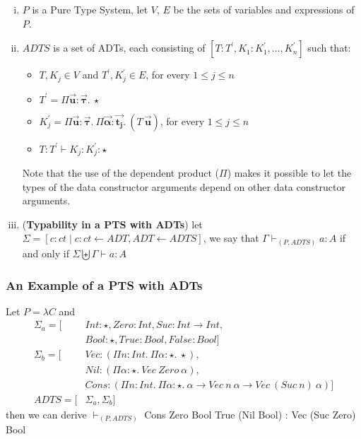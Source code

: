 \documentclass[oneside,a4paper]{article}
\numberwithin{equation}{section}
\begin{document}
\begin{enumerate}[(i)]
\item $P$ is a Pure Type System, let $V$, $E$ be the sets of variables
  and expressions of $P$.
\item $ADTS$ is a set of ADTs, each consisting of
  $[T : T^{\prime}, K_{1} : K_{1}^{\prime}, \dots, K_{n}^{\prime}]$
  such that:
  \begin{itemize}
  \item $T, K_{j} \in V$ and $T^{\prime}, K_{j}^{\prime} \in E$, for
    every $1 \leqslant j \leqslant n$
  \item
    $T^{\prime} = \Pi \vec{\mathbf{u}} : \vec{\mathbf{\tau}}.\ \star$
  \item
    $K_{j}^{\prime} = \Pi \vec{\mathbf{u}} : \vec{\mathbf{\tau}}.\ \Pi
    \vec{\mathbf{\alpha}}: \vec{\mathbf{t_{j}}}.\ (T\
    \vec{\mathbf{u}}) $, for every $1 \leqslant j \leqslant n$
  \item $T : T^{\prime} \vdash K_{j} : K_{j}^{\prime} : \star$
  \end{itemize}
  Note that the use of the dependent product ($\Pi$) makes it possible
  to let the types of the data constructor arguments depend on other
  data constructor arguments.
\item (\textbf{Typability in a PTS with ADTs}) let
  $\Sigma = [c : ct \mid c : ct \leftarrow ADT, ADT \leftarrow ADTS]$,
  we say that $\Gamma \vdash_{(P,ADTS)} a : A$ if and only if
  $\Sigma \biguplus \Gamma \vdash a : A$
\end{enumerate}

\subsubsection{An Example of a PTS with ADTs}

Let $P = \lambda C$ and
\begin{align*}
  \Sigma_{a} = [&Int : \star, Zero : Int, Suc : Int \rightarrow Int,\\
               &Bool : \star, True : Bool, False : Bool]\\
  \Sigma_{b} = [&Vec : (\Pi n : Int.\ \Pi \alpha : \star.\ \star),\\
                &Nil : (\Pi \alpha : \star.\ Vec\ Zero\ \alpha),\\
                &Cons : (\Pi n : Int.\ \Pi \alpha : \star.\ \alpha \rightarrow Vec\ n\ \alpha \rightarrow Vec\ (Suc\ n)\ \alpha)]\\
  ADTS = [&\Sigma_{a}, \Sigma_{b}]
\end{align*}
then we can derive $\vdash_{(P, ADTS)}$ Cons Zero Bool True (Nil Bool) : Vec (Suc Zero) Bool



\nocite{*}  
\end{document}
